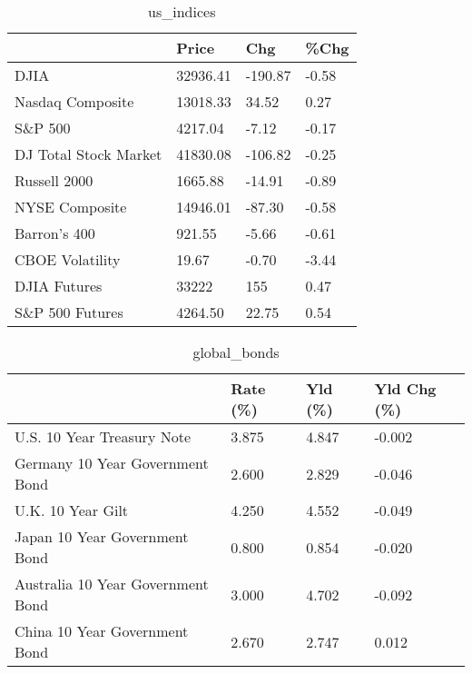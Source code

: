 \documentclass{article}%
\begin{document}
%


\begin{table}[htbp]%
\caption{us\_indices}%
\centering%
\begin{adjustbox}{width=1\textwidth}%
\begin{tabular}{llll}
\toprule
                      &    Price &     Chg &  \%Chg \\
\midrule
                 DJIA & 32936.41 & -190.87 & -0.58 \\
     Nasdaq Composite & 13018.33 &   34.52 &  0.27 \\
              S\&P 500 &  4217.04 &   -7.12 & -0.17 \\
DJ Total Stock Market & 41830.08 & -106.82 & -0.25 \\
         Russell 2000 &  1665.88 &  -14.91 & -0.89 \\
       NYSE Composite & 14946.01 &  -87.30 & -0.58 \\
         Barron's 400 &   921.55 &   -5.66 & -0.61 \\
      CBOE Volatility &    19.67 &   -0.70 & -3.44 \\
         DJIA Futures &    33222 &     155 &  0.47 \\
      S\&P 500 Futures &  4264.50 &   22.75 &  0.54 \\
\bottomrule
\end{tabular}
%
\end{adjustbox}%
\end{table}

%


\begin{table}[htbp]%
\caption{global\_bonds}%
\centering%
\begin{adjustbox}{width=1\textwidth}%
\begin{tabular}{llll}
\toprule
                                  & Rate (\%) & Yld (\%) & Yld Chg (\%) \\
\midrule
       U.S. 10 Year Treasury Note &    3.875 &   4.847 &      -0.002 \\
  Germany 10 Year Government Bond &    2.600 &   2.829 &      -0.046 \\
                U.K. 10 Year Gilt &    4.250 &   4.552 &      -0.049 \\
    Japan 10 Year Government Bond &    0.800 &   0.854 &      -0.020 \\
Australia 10 Year Government Bond &    3.000 &   4.702 &      -0.092 \\
    China 10 Year Government Bond &    2.670 &   2.747 &       0.012 \\
\bottomrule
\end{tabular}
%
\end{adjustbox}%
\end{table}
\end{document}
